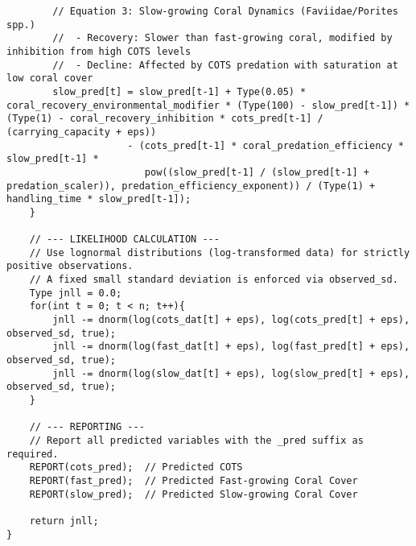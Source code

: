 \begin{lstlisting}
        // Equation 3: Slow-growing Coral Dynamics (Faviidae/Porites spp.)
        //  - Recovery: Slower than fast-growing coral, modified by inhibition from high COTS levels
        //  - Decline: Affected by COTS predation with saturation at low coral cover
        slow_pred[t] = slow_pred[t-1] + Type(0.05) * coral_recovery_environmental_modifier * (Type(100) - slow_pred[t-1]) * (Type(1) - coral_recovery_inhibition * cots_pred[t-1] / (carrying_capacity + eps))
                     - (cots_pred[t-1] * coral_predation_efficiency * slow_pred[t-1] *
                        pow((slow_pred[t-1] / (slow_pred[t-1] + predation_scaler)), predation_efficiency_exponent)) / (Type(1) + handling_time * slow_pred[t-1]);
    }
    
    // --- LIKELIHOOD CALCULATION ---
    // Use lognormal distributions (log-transformed data) for strictly positive observations.
    // A fixed small standard deviation is enforced via observed_sd.
    Type jnll = 0.0;
    for(int t = 0; t < n; t++){
        jnll -= dnorm(log(cots_dat[t] + eps), log(cots_pred[t] + eps), observed_sd, true);
        jnll -= dnorm(log(fast_dat[t] + eps), log(fast_pred[t] + eps), observed_sd, true);
        jnll -= dnorm(log(slow_dat[t] + eps), log(slow_pred[t] + eps), observed_sd, true);
    }
    
    // --- REPORTING ---
    // Report all predicted variables with the _pred suffix as required.
    REPORT(cots_pred);  // Predicted COTS
    REPORT(fast_pred);  // Predicted Fast-growing Coral Cover
    REPORT(slow_pred);  // Predicted Slow-growing Coral Cover
    
    return jnll;
}
\end{lstlisting}


